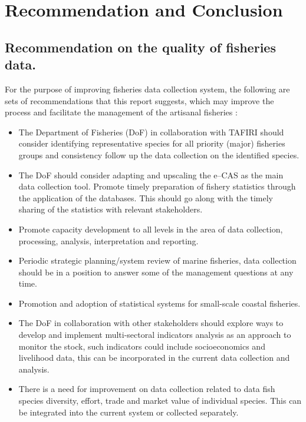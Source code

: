 \documentclass[
  12pt,
  a4paper,
  oneside]{book}
\providecommand{\tightlist}{%
  \setlength{\itemsep}{0pt}\setlength{\parskip}{0pt}}
\begin{document}
\hypertarget{recommendation-and-conclusion}{%
\chapter*{Recommendation and Conclusion}\label{recommendation-and-conclusion}}

\hypertarget{recommendation-on-the-quality-of-fisheries-data.}{%
\section*{Recommendation on the quality of fisheries data.}\label{recommendation-on-the-quality-of-fisheries-data.}}

For the purpose of improving fisheries data collection system, the following are sets of recommendations that this report suggests, which may improve the process and facilitate the management of the artisanal fisheries :

\begin{itemize}
\tightlist
\item
  The Department of Fisheries (DoF) in collaboration with TAFIRI should consider identifying representative species for all priority (major) fisheries groups and consistency follow up the data collection on the identified species.
\item
  The DoF should consider adapting and upscaling the e--CAS as the main data collection tool. Promote timely preparation of fishery statistics through the application of the databases. This should go along with the timely sharing of the statistics with relevant stakeholders.\\
\item
  Promote capacity development to all levels in the area of data collection, processing, analysis, interpretation and reporting.
\item
  Periodic strategic planning/system review of marine fisheries, data collection should be in a position to answer some of the management questions at any time.
\item
  Promotion and adoption of statistical systems for small-scale coastal fisheries.
\item
  The DoF in collaboration with other stakeholders should explore ways to develop and implement multi-sectoral indicators analysis as an approach to monitor the stock, such indicators could include socioeconomics and livelihood data, this can be incorporated in the current data collection and analysis.
\item
  There is a need for improvement on data collection related to data fish species diversity, effort, trade and market value of individual species. This can be integrated into the current system or collected separately.
\end{itemize}
\end{document}
